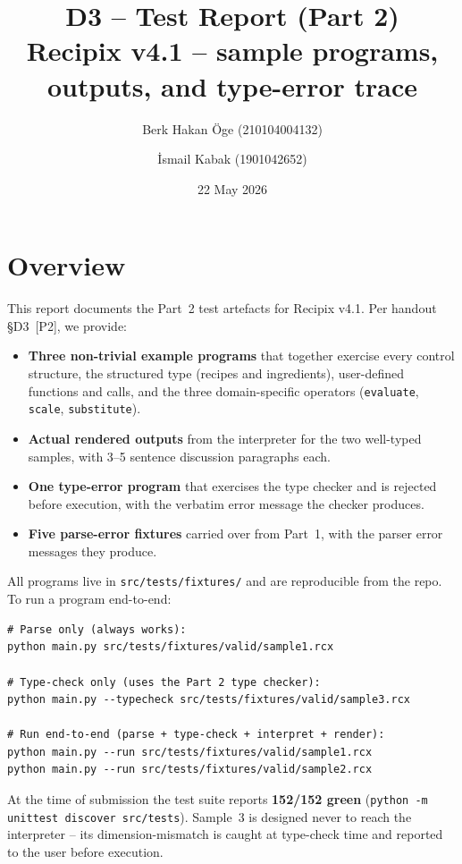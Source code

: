 \documentclass[11pt,a4paper]{article}
\title{\textbf{D3 -- Test Report (Part 2)} \\
       \large Recipix v4.1 -- sample programs, outputs, and type-error trace}
\author{Berk Hakan \"Oge (210104004132) \and \.Ismail Kabak (1901042652)}
\date{22 May 2026}
\begin{document}
\maketitle
\thispagestyle{fancy}


\section{Overview}

This report documents the Part~2 test artefacts for Recipix v4.1. Per
handout \S D3~[P2], we provide:
\begin{itemize}[leftmargin=*,itemsep=2pt]
  \item \textbf{Three non-trivial example programs} that together exercise
        every control structure, the structured type (recipes and
        ingredients), user-defined functions and calls, and the three
        domain-specific operators (\texttt{evaluate}, \texttt{scale},
        \texttt{substitute}).
  \item \textbf{Actual rendered outputs} from the interpreter for the two
        well-typed samples, with 3--5 sentence discussion paragraphs each.
  \item \textbf{One type-error program} that exercises the type checker
        and is rejected before execution, with the verbatim error message
        the checker produces.
  \item \textbf{Five parse-error fixtures} carried over from Part~1, with
        the parser error messages they produce.
\end{itemize}

All programs live in \texttt{src/tests/fixtures/} and are reproducible
from the repo. To run a program end-to-end:

\begin{lstlisting}[style=output]
# Parse only (always works):
python main.py src/tests/fixtures/valid/sample1.rcx

# Type-check only (uses the Part 2 type checker):
python main.py --typecheck src/tests/fixtures/valid/sample3.rcx

# Run end-to-end (parse + type-check + interpret + render):
python main.py --run src/tests/fixtures/valid/sample1.rcx
python main.py --run src/tests/fixtures/valid/sample2.rcx
\end{lstlisting}

\noindent At the time of submission the test suite reports \textbf{152/152
green} (\texttt{python -m unittest discover src/tests}). Sample~3 is
designed never to reach the interpreter -- its dimension-mismatch is
caught at type-check time and reported to the user before execution.
\end{document}
